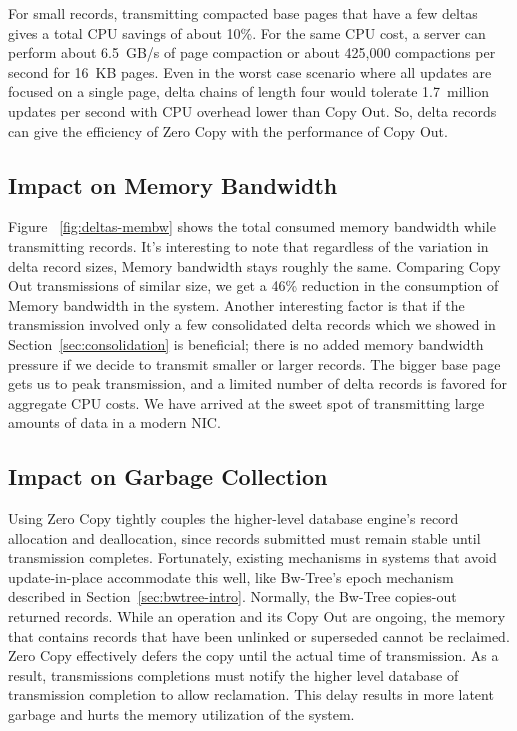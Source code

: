 For small records, transmitting compacted base pages that have a few deltas gives
a total CPU savings of about 10\%. For the same CPU cost, a server can perform
about 6.5~GB/s of page compaction or about 425,000 compactions per second for
16~KB pages. Even in the worst case scenario where all updates are focused on a
single page, delta chains of length four would tolerate 1.7~million updates per
second with CPU overhead lower than Copy Out. So, delta records can give the
efficiency of Zero Copy with the performance of Copy Out.


\subsection{Impact on Memory Bandwidth}
Figure ~\ref{fig:deltas-membw} shows the total consumed memory bandwidth while 
transmitting records. It's interesting to note that regardless of the variation in 
delta record sizes, Memory bandwidth stays roughly the same. Comparing Copy Out 
transmissions of similar size, we get a 46\% reduction in the consumption of 
Memory bandwidth in the system. Another interesting factor is that if the transmission 
involved only a few consolidated delta records which we showed in Section~\ref{sec:consolidation} is 
beneficial; there is no added memory bandwidth pressure if we decide to transmit smaller 
or larger records. The bigger base page gets us to peak transmission, and a limited number of 
delta records is favored for aggregate CPU costs. We have arrived at the sweet spot of 
transmitting large amounts of data in a modern NIC.



\subsection{Impact on Garbage Collection}

Using Zero Copy tightly couples the higher-level database engine's record
allocation and deallocation, since records submitted must remain stable until
transmission completes. Fortunately, existing mechanisms in systems that avoid
update-in-place accommodate this well, like Bw-Tree's epoch mechanism described
in Section~\ref{sec:bwtree-intro}. Normally, the Bw-Tree copies-out returned records.
While an operation and its Copy Out are ongoing, the memory that contains records
that have been unlinked or superseded cannot be reclaimed. Zero Copy
effectively defers the copy until the actual time of transmission. As a result,
transmissions completions must notify the higher level database of transmission
completion to allow reclamation. This delay results in more latent garbage and
hurts the memory utilization of the system.

